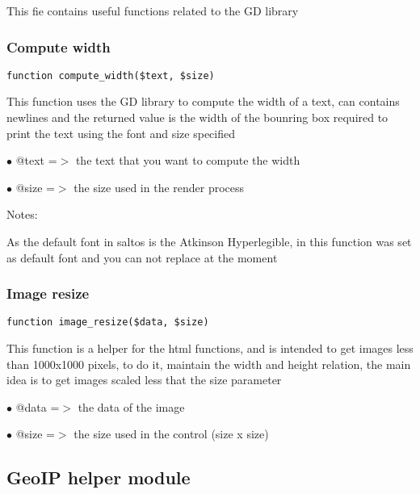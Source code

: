 \documentclass[a4paper]{article}
\begin{document}
This fie contains useful functions related to the GD library

\hypertarget{toc455}{}
\subsubsection{Compute width}

\begin{lstlisting}
function compute_width($text, $size)
\end{lstlisting}

This function uses the GD library to compute the width of a text,
can contains newlines and the returned value is the width of the
bounring box required to print the text using the font and size
specified

\begin{compactitem}
\item[\color{myblue}$\bullet$] @text =$>$ the text that you want to compute the width
\item[\color{myblue}$\bullet$] @size =$>$ the size used in the render process
\end{compactitem}

Notes:

As the default font in saltos is the Atkinson Hyperlegible, in this
function was set as default font and you can not replace at the
moment

\hypertarget{toc456}{}
\subsubsection{Image resize}

\begin{lstlisting}
function image_resize($data, $size)
\end{lstlisting}

This function is a helper for the html functions, and is intended to
get images less than 1000x1000 pixels, to do it, maintain the width and
height relation, the main idea is to get images scaled less that the size
parameter

\begin{compactitem}
\item[\color{myblue}$\bullet$] @data =$>$ the data of the image
\item[\color{myblue}$\bullet$] @size =$>$ the size used in the control (size x size)
\end{compactitem}

\hypertarget{toc457}{}
\subsection{GeoIP helper module}
\end{document}

